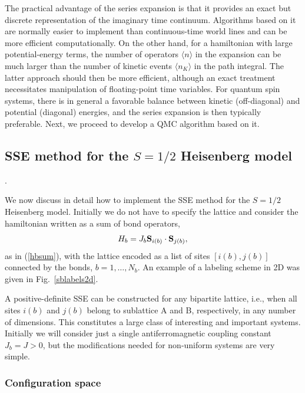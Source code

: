 \documentclass[draft,numberedheadings]{aipproc}
\begin{document}
The practical advantage of the series expansion is that it provides an exact but discrete representation of the imaginary time continuum. Algorithms 
based on it are normally easier to implement than continuous-time world lines and can be more efficient computationally. On the other hand, for a hamiltonian
with large potential-energy terms, the number of operators $\langle n\rangle$ in the expansion can be much larger than the number of kinetic events 
$\langle n_K\rangle$ in the path integral. The latter approach should then be more efficient, although an exact treatment necessitates manipulation of floating-point 
time variables. For quantum spin systems, there is in general a favorable balance between kinetic (off-diagonal) and potential (diagonal) energies, and 
the series expansion is then typically preferable. Next, we proceed to develop a QMC algorithm based on it.

\subsection{SSE method for the $S=1/2$ Heisenberg model}
\label{sseheisenberg}.

We now discuss in detail how to implement the SSE method for the $S=1/2$ Heisenberg model. Initially we do not have to specify the lattice and consider 
the hamiltonian written as a sum of bond operators,
\begin{equation}
H_b=J_{b}{\bf S}_{i(b)} \cdot {\bf S}_{j(b)},
\label{hbond}
\end{equation}
as in (\ref{hbsum}), with the lattice encoded as a list of sites $[i(b),j(b)]$ connected by the bonds, $b=1,\ldots,N_b$. An example of a 
labeling scheme in 2D was given in Fig.~\ref{sblabels2d}.

A positive-definite SSE can be constructed for any bipartite 
lattice, i.e., when all sites $i(b)$ and $j(b)$ belong to sublattice A and B, respectively, in any number of dimensions. This constitutes a large class
of interesting and important systems. Initially we will consider just a single antiferromagnetic coupling constant $J_{b}=J>0$, but the modifications
needed for non-uniform systems are very simple. 

\subsubsection{Configuration space}
\end{document}
